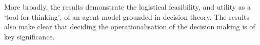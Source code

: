 More broadly, the results demonstrate the logistical feasibility, and utility as a `tool for thinking', of an agent model grounded in decision theory. The results also make clear that deciding the operationalisation of the decision making is of key significance.

